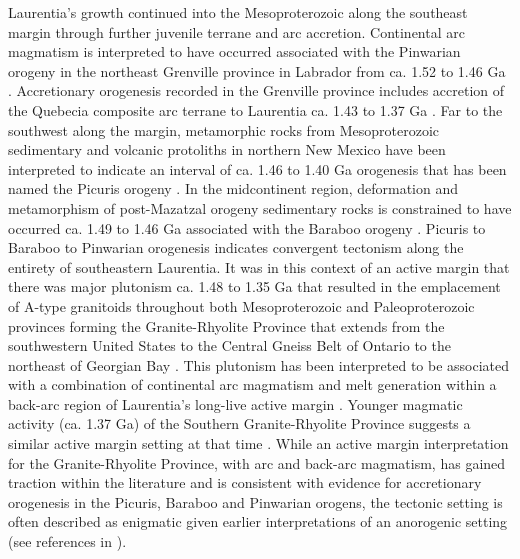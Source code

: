 \documentclass[twocolumn, switch]{article} %
\begin{document}
Laurentia's growth continued into the Mesoproterozoic along the southeast margin through further juvenile terrane and arc accretion. Continental arc magmatism is interpreted to have occurred associated with the Pinwarian orogeny in the northeast Grenville province in Labrador from ca. 1.52 to 1.46 Ga \citep{Gower2002a}. Accretionary orogenesis recorded in the Grenville province includes accretion of the Quebecia composite arc terrane to Laurentia ca. 1.43 to 1.37 Ga \citep{Groulier2020a}. Far to the southwest along the margin, metamorphic rocks from Mesoproterozoic sedimentary and volcanic protoliths in northern New Mexico have been interpreted to indicate an interval of ca. 1.46 to 1.40 Ga orogenesis that has been named the Picuris orogeny \citep{Daniel2013a, Aronoff2016a}. In the midcontinent region,  deformation and metamorphism of post-Mazatzal orogeny sedimentary rocks is constrained to have occurred ca. 1.49 to 1.46 Ga associated with the Baraboo orogeny \citep{Medaris2003a, Holm2019a}. Picuris to Baraboo to Pinwarian orogenesis indicates convergent tectonism along the entirety of southeastern Laurentia.  It was in this context of an active margin that there was major plutonism ca. 1.48 to 1.35 Ga that resulted in the emplacement of A-type granitoids throughout both Mesoproterozoic and Paleoproterozoic provinces forming the Granite-Rhyolite Province that extends from the southwestern United States to the Central Gneiss Belt of Ontario to the northeast of Georgian Bay \citep{Slagstad2009a}. This plutonism has been interpreted to be associated with a combination of continental arc magmatism and melt generation within a back-arc region of Laurentia's long-live active margin \citep{Bickford2015a}. Younger magmatic activity (ca. 1.37 Ga) of the Southern Granite-Rhyolite Province suggests a similar active margin setting at that time \citep{Bickford2015a}. While an active margin interpretation for the Granite-Rhyolite Province, with arc and back-arc magmatism, has gained traction within the literature and is consistent with evidence for accretionary orogenesis in the Picuris, Baraboo and Pinwarian orogens, the tectonic setting is often described as enigmatic given earlier interpretations of an anorogenic setting (see references in \citealp{Slagstad2009a}).
\end{document}
